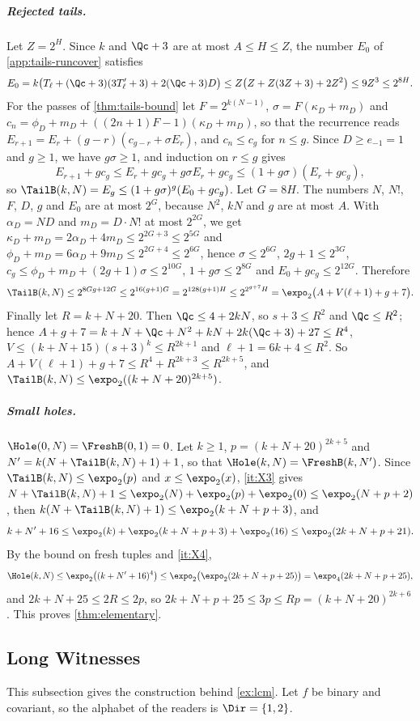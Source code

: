 \subparagraph*{Rejected tails.}
Let $Z=2^H$. Since $k$ and $\Qc+3$ are at most $A\le H\le Z$, the number $E_0$
of \cref{app:tails-runcover} satisfies
\[
  E_0=k\bigl(T_\ell+(\Qc+3)(3T'_\ell+3)+2(\Qc+3)D\bigr)
  \le Z\bigl(Z+Z(3Z+3)+2Z^2\bigr)\le9Z^3\le2^{8H}.
\]
For the passes of \cref{thm:tails-bound} let $F=2^{k(N-1)}$,
$\sigma=F(\kappa_D+m_D)$ and $c_n=\phi_D+m_D+((2n+1)F-1)(\kappa_D+m_D)$, so
that the recurrence reads $E_{r+1}=E_r+(g-r)(c_{g-r}+\sigma E_r)$, and
$c_n\le c_g$ for $n\le g$. Since $D\ge e_{-1}=1$ and $g\ge1$, we have
$g\sigma\ge1$, and induction on $r\le g$ gives
\[
  E_{r+1}+gc_g\le E_r+gc_g+g\sigma E_r+gc_g\le(1+g\sigma)(E_r+gc_g),
\]
so $\TailB(k,N)=E_g\le(1+g\sigma)^g(E_0+gc_g)$.
Let $G=8H$. The numbers $N$, $N!$, $F$, $D$, $g$ and $E_0$ are at most
$2^G$, because $N^2$, $kN$ and $g$ are at most $A$. With $\alpha_D=ND$ and
$m_D=D\cdot N!$ at most $2^{2G}$, we get $\kappa_D+m_D=2\alpha_D+4m_D\le
2^{2G+3}\le2^{5G}$ and $\phi_D+m_D=6\alpha_D+9m_D\le2^{2G+4}\le2^{6G}$, hence
$\sigma\le2^{6G}$, $2g+1\le2^{3G}$, $c_g\le\phi_D+m_D+(2g+1)\sigma\le
2^{10G}$, $1+g\sigma\le2^{8G}$ and $E_0+gc_g\le2^{12G}$. Therefore
\[
  \TailB(k,N)\le2^{8Gg+12G}\le2^{16(g+1)G}=2^{128(g+1)H}\le
  2^{2^{g+7}H}=\expo_2\bigl(A+V(\ell+1)+g+7\bigr).
\]
Finally let $R=k+N+20$. Then $\Qc\le4+2kN$, so $s+3\le R^2$ and $\Qc\le R^2$;
hence $A+g+7=k+N+\Qc+N^2+kN+2k(\Qc+3)+27\le R^4$,
$V\le(k+N+15)(s+3)^k\le R^{2k+1}$ and $\ell+1=6k+4\le R^2$. So
$A+V(\ell+1)+g+7\le R^4+R^{2k+3}\le R^{2k+5}$, and
$\TailB(k,N)\le\expo_2((k+N+20)^{2k+5})$.

\subparagraph*{Small holes.}
$\Hole(0,N)=\FreshB(0,1)=0$. Let $k\ge1$, $p=(k+N+20)^{2k+5}$ and
$N'=k(N+\TailB(k,N)+1)+1$, so that $\Hole(k,N)=\FreshB(k,N')$. Since
$\TailB(k,N)\le\expo_2(p)$ and $x\le\expo_2(x)$, \ref{it:X3} gives
$N+\TailB(k,N)+1\le\expo_2(N)+\expo_2(p)+\expo_2(0)\le\expo_2(N+p+2)$, then
$k(N+\TailB(k,N)+1)\le\expo_2(k+N+p+3)$, and
\[
  k+N'+16\le\expo_2(k)+\expo_2(k+N+p+3)+\expo_2(16)\le\expo_2(2k+N+p+21).
\]
By the bound on fresh tuples and \ref{it:X4},
\[
  \Hole(k,N)\le\expo_2\bigl((k+N'+16)^4\bigr)\le
  \expo_2\bigl(\expo_2(2k+N+p+25)\bigr)=\expo_4(2k+N+p+25),
\]
and $2k+N+25\le2R\le2p$, so $2k+N+p+25\le3p\le Rp=(k+N+20)^{2k+6}$. This
proves \cref{thm:elementary}.

\subsection{Long Witnesses}\label{app:complexity-long}

This subsection gives the construction behind \cref{ex:lcm}. Let $f$ be
binary and covariant, so the alphabet of the readers is $\Dir=\{1,2\}$.


